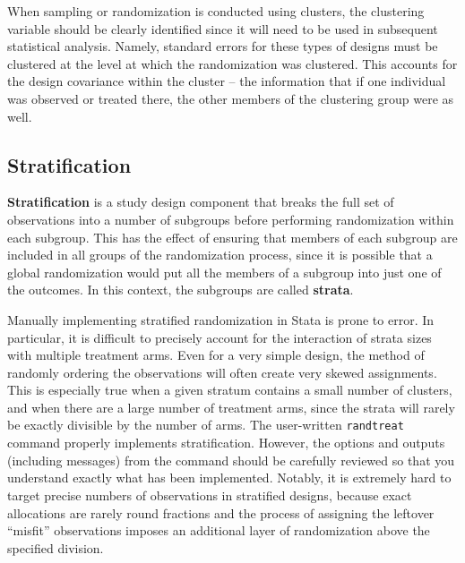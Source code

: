 When sampling or randomization is conducted using clusters,
the clustering variable should be clearly identified
since it will need to be used in subsequent statistical analysis.
Namely, standard errors for these types of designs must be clustered
at the level at which the randomization was clustered.
This accounts for the design covariance within the cluster --
the information that if one individual was observed or treated there,
the other members of the clustering group were as well.

\subsection{Stratification}

\textbf{Stratification} is a study design component
that breaks the full set of observations into a number of subgroups
before performing randomization within each subgroup.
This has the effect of ensuring that members of each subgroup
are included in all groups of the randomization process,
since it is possible that a global randomization
would put all the members of a subgroup into just one of the outcomes.
In this context, the subgroups are called \textbf{strata}.

Manually implementing stratified randomization in Stata is prone to error.
In particular, it is difficult to precisely account
for the interaction of strata sizes with multiple treatment arms.
Even for a very simple design, the method of randomly ordering the observations
will often create very skewed assignments.
This is especially true when a given stratum contains a small number of clusters,
and when there are a large number of treatment arms,
since the strata will rarely be exactly divisible by the number of arms.\cite{carril2017dealing}
The user-written \texttt{randtreat} command properly implements stratification.
However, the options and outputs (including messages) from the command should be carefully reviewed
so that you understand exactly what has been implemented.
Notably, it is extremely hard to target precise numbers of observations
in stratified designs, because exact allocations are rarely round fractions
and the process of assigning the leftover ``misfit'' observations
imposes an additional layer of randomization above the specified division.

